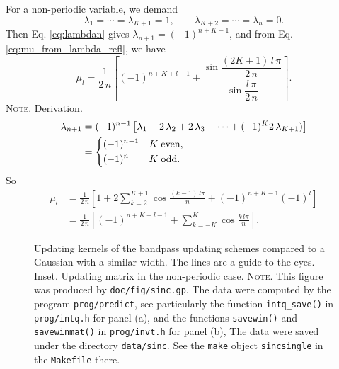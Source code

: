 \documentclass[reprint, superscriptaddress, floatfix]{revtex4-1}
\newcommand{\note}[1]{{\color{DarkGreen}\footnotesize \textsc{Note.} #1}}
\begin{document}
For a non-periodic variable, we demand
$$
\lambda_1 = \cdots = \lambda_{K+1} = 1,
\qquad
\lambda_{K+2} = \cdots = \lambda_n = 0.
$$
Then Eq. \eqref{eq:lambdan} gives
$\lambda_{n+1} = (-1)^{n+K-1}$,
and from Eq. \eqref{eq:mu_from_lambda_refl},
we have
\begin{equation}
  \mu_l
  =
  \frac{1}{2 \, n}
  \left[
    (-1)^{n+K+l-1}
    +
    \frac{
      \sin
      \dfrac{ (2 K + 1) \, l \, \pi }
           {         2 \, n        }
    }
    {
      \sin \dfrac{ l \, \pi } { 2 \, n }
    }
  \right]
  .
\label{eq:mu_sinc_refl}
\end{equation}
\note{Derivation.
$$
\begin{aligned}
  \lambda_{n+1}
  &=
  (-1)^{n-1}
  \left[
    \lambda_1
    - 2 \, \lambda_2
    + 2 \, \lambda_3 - \cdots
    + (-1)^{K} 2 \, \lambda_{K+1})
  \right]
  \\
  &=
  \begin{dcases}
    (-1)^{n-1} & K \mathrm{\; even,} \\
    (-1)^n     & K \mathrm{\; odd.}
  \end{dcases}
\end{aligned}
$$
So
$$
\begin{aligned}
  \mu_l
  &=
  \frac{1}{2\,n}
  \left[
    1 +
    2 \sum_{k=2}^{K+1}
    \cos \frac { (k - 1) \, l \pi } { n }
    +
    (-1)^{n+K-1} (-1)^l
  \right]
  \\
  &=
  \frac{1}{2\,n}
  \left[
    (-1)^{n+K+l-1}
    +
    \sum_{k=-K}^{K}
    \cos \frac { k \, l \pi } { n }
  \right]
  .
\end{aligned}
$$
}%


\begin{figure}[h]
\begin{center}
  \caption{
    \label{fig:sinc}
    Updating kernels of the bandpass updating schemes
    compared to a Gaussian with a similar width.
    The lines are a guide to the eyes.
    Inset. Updating matrix in the non-periodic case.
    \note{This figure was produced by \texttt{doc/fig/sinc.gp}.
      The data were computed by the program \texttt{prog/predict},
      see particularly the function \texttt{intq\_save()}
      in \texttt{prog/intq.h} for panel (a),
      and the functions \texttt{savewin()}
      and \texttt{savewinmat()}
      in \texttt{prog/invt.h} for panel (b),
      The data were saved under the directory \texttt{data/sinc}.
      See the \texttt{make} object \texttt{sincsingle}
      in the \texttt{Makefile} there.
    }%
  }
\end{center}
\end{figure}
\end{document}
